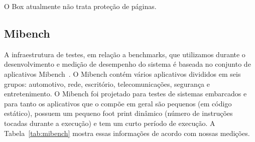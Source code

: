\documentclass[11pt,twoside]{article}
\begin{document}
O Box atualmente não trata proteção de páginas.

\subsection{Mibench}

A infraestrutura de testes, em relação a benchmarks, que utilizamos durante o
desenvolvimento e medição de desempenho do sistema é baseada no conjunto de
aplicativos Mibench~\cite{mibench}. O Mibench contém vários aplicativos
divididos em seis grupos: automotivo, rede, escritório, telecomunicações,
segurança e entretenimento. O Mibench foi projetado para testes de sistemas
embarcados e para tanto os aplicativos que o compõe em geral são pequenos (em
código estático), possuem um pequeno foot print dinâmico (número de instruções
tocadas durante a execução) e tem um curto período de execução.  A
Tabela~\ref{tab:mibench} mostra essas informações de acordo com nossas medições.
\end{document}
